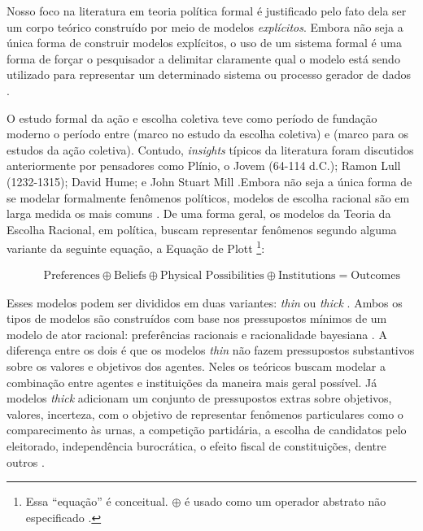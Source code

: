 Nosso foco na
literatura em teoria política formal é justificado pelo fato dela ser um corpo
teórico construído por meio de modelos
\textit{explícitos}\cite{epstein2008model}. Embora não seja a única forma de
construir modelos explícitos, o uso de um sistema formal é uma forma de forçar o
pesquisador a delimitar claramente qual o modelo está sendo utilizado para
representar um determinado sistema ou processo gerador de dados
\cite{morton1999methods, smaldino2017models}.

O estudo formal da ação e escolha coletiva teve como período de fundação moderno
o período entre  (marco no estudo da escolha
coletiva) e  (marco para os estudos da ação
coletiva). Contudo, \textit{insights} típicos da literatura foram discutidos
anteriormente por pensadores como Plínio, o Jovem (64-114 d.C.); Ramon Lull
(1232-1315); David Hume; e John Stuart Mill \cite{mclean2015strange,
  sep-free-rider, ordeshook1990emerging}.Embora não seja a única forma de se
modelar formalmente fenômenos políticos, modelos de escolha racional são em
larga medida os mais comuns \cite{austen1998social}. De uma forma geral, os
modelos da Teoria da Escolha Racional, em política, buscam representar fenômenos
segundo alguma variante da seguinte equação, a Equação de Plott
\cite{munger2015choosing, ostrom1986agenda}\footnote{Essa ``equação'' é
  conceitual. \(\oplus\) é usado como um operador abstrato não especificado
  \cite{ostrom1986agenda}. }:
\begin{figure}[H]
\begin{align*}
  \text{Preferences} \oplus \text{Beliefs}  \oplus  \text{Physical Possibilities} \oplus \text{Institutions} = \text{Outcomes}
\end{align*}
\end{figure}
Esses modelos podem ser divididos em duas variantes: \textit{thin} ou
\textit{thick} \cite{hechter1997sociological, green1996pathologies}. Ambos os
tipos de modelos são construídos com base nos pressupostos mínimos de um modelo
de ator racional: preferências racionais e racionalidade bayesiana
\cite{gintis2016individuality}. A diferença entre os dois é que os modelos
\textit{thin} não fazem pressupostos substantivos sobre os valores e objetivos
dos agentes. Neles os teóricos buscam modelar a combinação entre agentes e
instituições da maneira mais geral possível. Já modelos \textit{thick} adicionam
um conjunto de pressupostos extras sobre objetivos, valores, incerteza, com o
objetivo de representar fenômenos particulares como o comparecimento às urnas, a
competição partidária, a escolha de candidatos pelo eleitorado, independência
burocrática, o efeito fiscal de constituições, dentre outros
\cite{bendor2011behavioral}.

